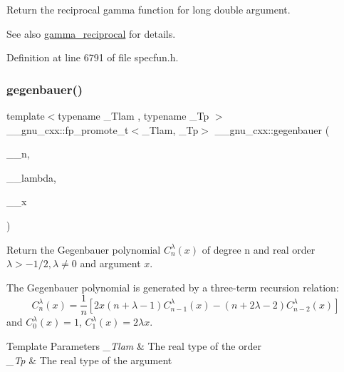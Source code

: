 Return the reciprocal gamma function for {\ttfamily  long double } argument.

\begin{DoxySeeAlso}{See also}
\hyperlink{group__gnu__math__spec__func_ga641f9bcdb8fc32a9a0ce7a15b5040076}{gamma\+\_\+reciprocal} for details. 
\end{DoxySeeAlso}


Definition at line 6791 of file specfun.\+h.

\mbox{\label{group__gnu__math__spec__func_ga512e7981e328d6184f604de1892048b6}} 
\subsubsection{\texorpdfstring{gegenbauer()}{gegenbauer()}}
{\footnotesize\ttfamily template$<$typename \+\_\+\+Tlam , typename \+\_\+\+Tp $>$ \\
\+\_\+\+\_\+gnu\+\_\+cxx\+::fp\+\_\+promote\+\_\+t$<$\+\_\+\+Tlam, \+\_\+\+Tp$>$ \+\_\+\+\_\+gnu\+\_\+cxx\+::gegenbauer (\begin{DoxyParamCaption}\item[{unsigned int}]{\+\_\+\+\_\+n,  }\item[{\+\_\+\+Tlam}]{\+\_\+\+\_\+lambda,  }\item[{\+\_\+\+Tp}]{\+\_\+\+\_\+x }\end{DoxyParamCaption})\hspace{0.3cm}{\ttfamily [inline]}}

Return the Gegenbauer polynomial $ C_n^{\lambda}(x) $ of degree {\ttfamily n} and real order $ \lambda > -1/2, \lambda \neq 0 $ and argument $ x $.

The Gegenbauer polynomial is generated by a three-\/term recursion relation\+: \[ C_n^{\lambda}(x) = \frac{1}{n}\left[ 2x(n+\lambda-1)C_{n-1}^{\lambda}(x) - (n+2\lambda-2)C_{n-2}^{\lambda}(x) \right] \] and $ C_0^{\lambda}(x) = 1 $, $ C_1^{\lambda}(x) = 2\lambda x $.


\begin{DoxyTemplParams}{Template Parameters}
{\em \+\_\+\+Tlam} & The real type of the order \\
\hline
{\em \+\_\+\+Tp} & The real type of the argument \\
\hline
\end{DoxyTemplParams}

